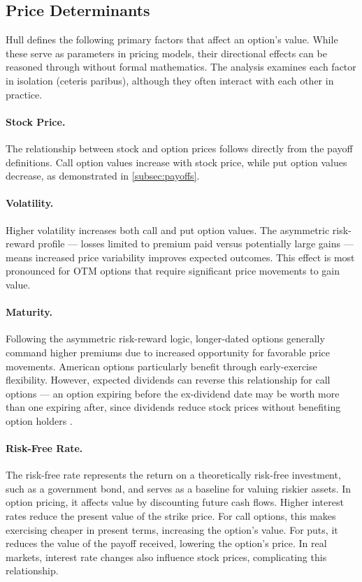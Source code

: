 \documentclass[english,12pt,a4paper,pdftex,sci,utf8]{aaltothesis}
\begin{document}
\subsection{Price Determinants}

Hull \cite{hull2018} defines the following primary factors that affect an option's value. While these serve as parameters in pricing models, their directional effects can be reasoned through without formal mathematics. The analysis examines each factor in isolation (ceteris paribus), although they often interact with each other in practice.

\paragraph{Stock Price.} The relationship between stock and option prices follows directly from the payoff definitions. Call option values increase with stock price, while put option values decrease, as demonstrated in \cref{subsec:payoffs}.

\paragraph{Volatility.} Higher volatility increases both call and put option values. The asymmetric risk-reward profile --- losses limited to premium paid versus potentially large gains --- means increased price variability improves expected outcomes. This effect is most pronounced for OTM options that require significant price movements to gain value.

\paragraph{Maturity.} Following the asymmetric risk-reward logic, longer-dated options generally command higher premiums due to increased opportunity for favorable price movements. American options particularly benefit through early-exercise flexibility. However, expected dividends can reverse this relationship for call options --- an option expiring before the ex-dividend date may be worth more than one expiring after, since dividends reduce stock prices without benefiting option holders \cite{hull2018}.

\paragraph{Risk-Free Rate.} The risk-free rate represents the return on a theoretically risk-free investment, such as a government bond, and serves as a baseline for valuing riskier assets. In option pricing, it affects value by discounting future cash flows. Higher interest rates reduce the present value of the strike price. For call options, this makes exercising cheaper in present terms, increasing the option’s value. For puts, it reduces the value of the payoff received, lowering the option’s price. In real markets, interest rate changes also influence stock prices, complicating this relationship.
\end{document}
